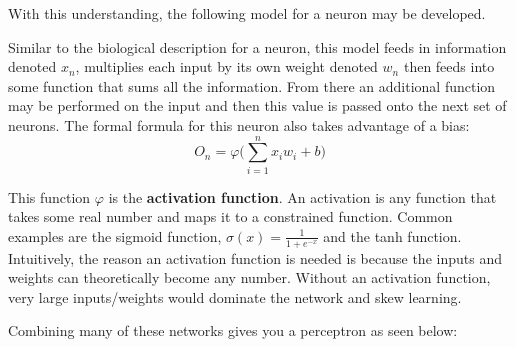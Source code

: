 \documentclass[12pt]{article}
\begin{document}
With this understanding, the following model for a neuron may be developed. 


\begin{center}
	
\end{center}

Similar to the biological description for a neuron, this model feeds in information denoted $x_n$, multiplies each input by its own weight denoted $w_n$ then feeds into some function that sums all the information. From there an additional function may be performed on the input and then this value is passed onto the next set of neurons. The formal formula for this neuron also takes advantage of a bias:
$$
O_n = \varphi \Big(\sum_{i=1}^{n}{x_iw_i} + b\Big)
$$ 

This function $\varphi$ is the \textbf{activation function}. An activation is any function that takes some real number and maps it to a constrained function. Common examples are the sigmoid function, $\sigma(x)=\frac{1}{1+e^{-x}}$ and the tanh function. Intuitively, the reason an activation function is needed is because the inputs and weights can theoretically become any number. Without an activation function, very large inputs/weights would dominate the network and skew learning.

Combining many of these networks gives you a perceptron as seen below:
\newline
\newline
\newline
\newline
\end{document}
